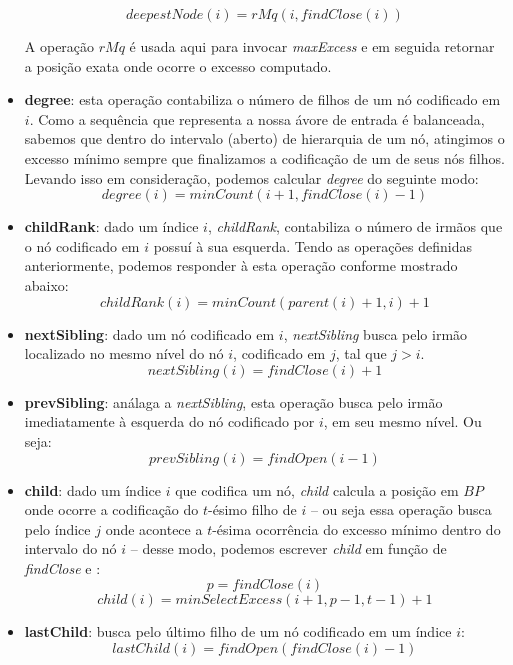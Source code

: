 \begin{itemize}
        $$deepestNode(i) = rMq(i, findClose(i))$$

        A operação $rMq$ é usada aqui para invocar \textit{maxExcess} e em seguida retornar a posição exata onde ocorre o excesso computado.

        \item \textbf{degree}: esta operação contabiliza o número de filhos de um nó codificado em $i$. Como a sequência que representa a nossa ávore de entrada é balanceada, sabemos que dentro do intervalo (aberto) de hierarquia de um nó, atingimos o excesso mínimo sempre que finalizamos a codificação de um de seus nós filhos. Levando isso em consideração, podemos calcular \textit{degree} do seguinte modo:
        $$degree(i) = minCount(i+1, findClose(i)-1)$$
        
        \item \textbf{childRank}: dado um índice $i$, \textit{childRank}, contabiliza o número de irmãos que o nó codificado em $i$ possuí à sua esquerda. Tendo as operações definidas anteriormente, podemos responder à esta operação conforme mostrado abaixo:
        $$
               childRank(i) = minCount(parent(i)+1, i) +1
        $$
        
        \item \textbf{nextSibling}: dado um nó codificado em $i$, \textit{nextSibling} busca pelo irmão localizado no mesmo nível do nó $i$, codificado em $j$, tal que $j>i$.
        $$nextSibling(i) = findClose(i) +1$$
        
        \item \textbf{prevSibling}: análaga a \textit{nextSibling}, esta operação busca pelo irmão imediatamente à esquerda do nó codificado por $i$, em seu mesmo nível. Ou seja:
        $$prevSibling(i) = findOpen(i-1)$$
        
        \item \textbf{child}: dado um índice $i$ que codifica um nó, \textit{child} calcula a posição em $BP$ onde ocorre a codificação do $t$-ésimo filho de $i$  -- ou seja essa operação busca pelo índice $j$ onde acontece a $t$-ésima ocorrência do excesso mínimo dentro do intervalo do nó $i$ --  desse modo, podemos escrever
        \textit{child} em função de \textit{findClose} e :
        $$p = findClose(i)$$
        $$child(i) = minSelectExcess(i+1,p-1,t-1) + 1 $$

        \item \textbf{lastChild}: busca pelo último filho de um nó codificado em um índice $i$:
        $$lastChild(i) = findOpen(findClose(i)-1)$$
        

\end{itemize}
